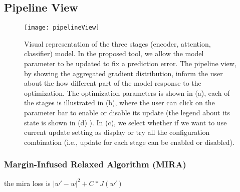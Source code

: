 \subsection{Pipeline View}

\begin{figure}[htbp]
\centering
\vspace{-2mm}
 \texttt{[image: pipelineView]}
 \caption{
Visual representation of the three stages (encoder, attention, classifier) model. In the proposed tool, we allow the model parameter to be updated to fix a prediction error. The pipeline view, by showing the aggregated gradient distribution, inform the user about the how different part of the model response to the optimization.
%
The optimization parameters is shown in (a), each of the stages is illustrated in (b), where the user can click on the parameter bar to enable or disable its update (the legend about its state is shown in (d) ). In (c), we select whether if we want to use current update setting as display or try all the configuration combination (i.e., update for each stage can be enabled or disabled).
 }
\label{fig:modelPipeline}
\end{figure}

\subsubsection{Margin-Infused Relaxed Algorithm (MIRA)}
the mira loss is $|w' - w|^2 + C * J(w')$
